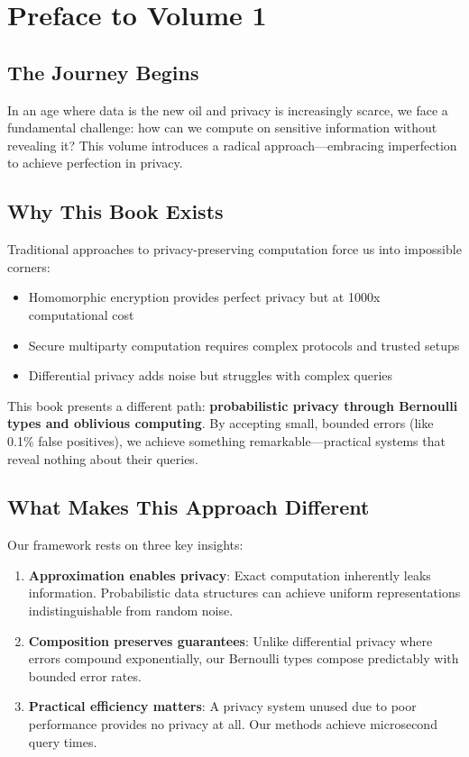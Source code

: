 \chapter*{Preface to Volume 1}

\section*{The Journey Begins}

In an age where data is the new oil and privacy is increasingly scarce, we face a fundamental challenge: how can we compute on sensitive information without revealing it? This volume introduces a radical approach—embracing imperfection to achieve perfection in privacy.

\section*{Why This Book Exists}

Traditional approaches to privacy-preserving computation force us into impossible corners:
\begin{itemize}
\item Homomorphic encryption provides perfect privacy but at 1000x computational cost
\item Secure multiparty computation requires complex protocols and trusted setups
\item Differential privacy adds noise but struggles with complex queries
\end{itemize}

This book presents a different path: \textbf{probabilistic privacy through Bernoulli types and oblivious computing}. By accepting small, bounded errors (like 0.1\% false positives), we achieve something remarkable—practical systems that reveal nothing about their queries.

\section*{What Makes This Approach Different}

Our framework rests on three key insights:

\begin{enumerate}
\item \textbf{Approximation enables privacy}: Exact computation inherently leaks information. Probabilistic data structures can achieve uniform representations indistinguishable from random noise.

\item \textbf{Composition preserves guarantees}: Unlike differential privacy where errors compound exponentially, our Bernoulli types compose predictably with bounded error rates.

\item \textbf{Practical efficiency matters}: A privacy system unused due to poor performance provides no privacy at all. Our methods achieve microsecond query times.
\end{enumerate}

